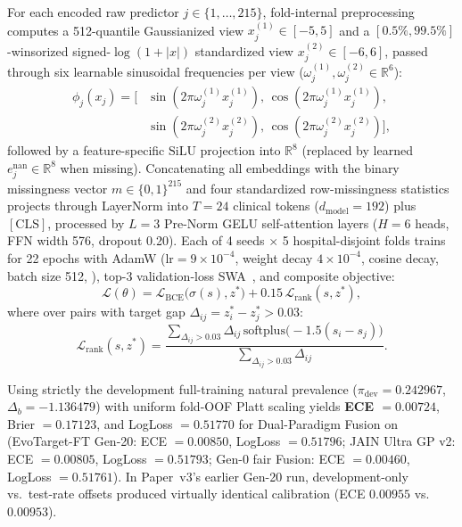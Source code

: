For each encoded raw predictor $j \in \{1,\dots,215\}$, fold-internal preprocessing computes a 512-quantile Gaussianized view $x^{(1)}_j \in [-5,5]$ and a $[0.5\%,99.5\%]$-winsorized signed-$\log(1+|x|)$ standardized view $x^{(2)}_j \in [-6,6]$, passed through six learnable sinusoidal frequencies per view ($\omega^{(1)}_j, \omega^{(2)}_j \in \mathbb{R}^6$):
\begin{equation}
  \begin{aligned}
  \phi_j(x_j) = \big[&\sin(2\pi \omega^{(1)}_j x^{(1)}_j),\, \cos(2\pi \omega^{(1)}_j x^{(1)}_j), \\
                     &\sin(2\pi \omega^{(2)}_j x^{(2)}_j),\, \cos(2\pi \omega^{(2)}_j x^{(2)}_j)\big],
  \end{aligned}
  \label{eq:plr}
\end{equation}
followed by a feature-specific $\mathrm{SiLU}$ projection into $\mathbb{R}^8$ (replaced by learned $e^{\mathrm{nan}}_j \in \mathbb{R}^8$ when missing). Concatenating all embeddings with the binary missingness vector $m \in \{0,1\}^{215}$ and four standardized row-missingness statistics projects through LayerNorm into $T=24$ clinical tokens ($d_{\mathrm{model}}=192$) plus $[\mathrm{CLS}]$, processed by $L=3$ Pre-Norm GELU self-attention layers ($H=6$ heads, FFN width 576, dropout 0.20). Each of 4 seeds $\times$ 5 hospital-disjoint folds trains for 22 epochs with AdamW ($\mathrm{lr}=9\times 10^{-4}$, weight decay $4\times 10^{-4}$, cosine decay, batch size 512, ), top-3 validation-loss SWA~\cite{izmailov2018swa}, and composite objective:
\begin{equation}
  \mathcal{L}(\theta) = \mathcal{L}_{\mathrm{BCE}}\big(\sigma(s), z^*\big) + 0.15\,\mathcal{L}_{\mathrm{rank}}(s, z^*),
  \label{eq:loss}
\end{equation}
where over pairs with target gap $\Delta_{ij} = z^*_i - z^*_j > 0.03$:
\begin{equation}
  \mathcal{L}_{\mathrm{rank}}(s, z^*) = \frac{\sum_{\Delta_{ij} > 0.03} \Delta_{ij}\,\mathrm{softplus}\big(-1.5(s_i - s_j)\big)}{\sum_{\Delta_{ij} > 0.03} \Delta_{ij}}.
  \label{eq:rank}
\end{equation}

Using strictly the development full-training natural prevalence ($\pi_{\mathrm{dev}} = 0.242967$, $\Delta_b = -1.136479$) with uniform fold-OOF Platt scaling yields \textbf{ECE $= 0.00724$}, Brier $= 0.17123$, and LogLoss $= 0.51770$ for Dual-Paradigm Fusion on  (EvoTarget-FT Gen-20: ECE $= 0.00850$, LogLoss $= 0.51796$; JAIN Ultra GP v2: ECE $= 0.00805$, LogLoss $= 0.51793$; Gen-0 fair Fusion: ECE $= 0.00460$, LogLoss $= 0.51761$). In Paper~v3's earlier Gen-20 run, development-only vs.\ test-rate offsets produced virtually identical calibration (ECE $0.00955$ vs.\ $0.00953$).


